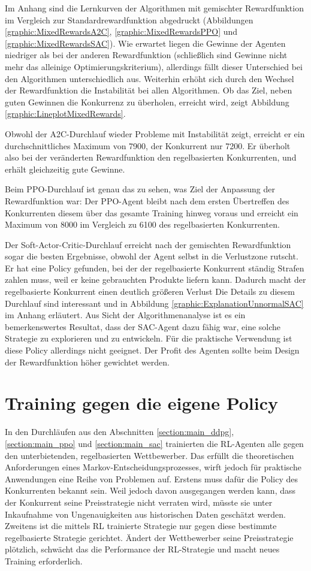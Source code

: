 Im Anhang sind die Lernkurven der Algorithmen mit gemischter Rewardfunktion im Vergleich zur Standardrewardfunktion abgedruckt (Abbildungen \ref{graphic:MixedRewardsA2C}, \ref{graphic:MixedRewardsPPO} und \ref{graphic:MixedRewardsSAC}).
Wie erwartet liegen die Gewinne der Agenten niedriger als bei der anderen Rewardfunktion (schließlich sind Gewinne nicht mehr das alleinige Optimierungskriterium), allerdings fällt dieser Unterschied bei den Algorithmen unterschiedlich aus.
Weiterhin erhöht sich durch den Wechsel der Rewardfunktion die Instabilität bei allen Algorithmen.
Ob das Ziel, neben guten Gewinnen die Konkurrenz zu überholen, erreicht wird, zeigt Abbildung \ref{graphic:LineplotMixedRewards}.

Obwohl der A2C-Durchlauf wieder Probleme mit Instabilität zeigt, erreicht er ein durchschnittliches Maximum von 7900, der Konkurrent nur 7200.
Er überholt also bei der veränderten Rewardfunktion den regelbasierten Konkurrenten, und erhält gleichzeitig gute Gewinne.

Beim PPO-Durchlauf ist genau das zu sehen, was Ziel der Anpassung der Rewardfunktion war:
Der PPO-Agent bleibt nach dem ersten Übertreffen des Konkurrenten diesem über das gesamte Training hinweg voraus und erreicht ein Maximum von 8000 im Vergleich zu 6100 des regelbasierten Konkurrenten.

Der Soft-Actor-Critic-Durchlauf erreicht nach der gemischten Rewardfunktion sogar die besten Ergebnisse, obwohl der Agent selbst in die Verlustzone rutscht.
Er hat eine Policy gefunden, bei der der regelbasierte Konkurrent ständig Strafen zahlen muss, weil er keine gebrauchten Produkte liefern kann.
Dadurch macht der regelbasierte Konkurrent einen deutlich größeren Verlust
Die Details zu diesem Durchlauf sind interessant und in Abbildung \ref{graphic:ExplanationUnnormalSAC} im Anhang erläutert.
Aus Sicht der Algorithmenanalyse ist es ein bemerkenswertes Resultat, dass der SAC-Agent dazu fähig war, eine solche Strategie zu explorieren und zu entwickeln.
Für die praktische Verwendung ist diese Policy allerdings nicht geeignet.
Der Profit des Agenten sollte beim Design der Rewardfunktion höher gewichtet werden.

\section{Training gegen die eigene Policy}
\label{section:self_play}
In den Durchläufen aus den Abschnitten \ref{section:main_ddpg}, \ref{section:main_ppo} und \ref{section:main_sac} trainierten die RL-Agenten alle gegen den unterbietenden, regelbasierten Wettbewerber.
Das erfüllt die theoretischen Anforderungen eines Markov-Entscheidungsprozesses, wirft jedoch für praktische Anwendungen eine Reihe von Problemen auf.
Erstens muss dafür die Policy des Konkurrenten bekannt sein.
Weil jedoch davon ausgegangen werden kann, dass der Konkurrent seine Preisstrategie nicht verraten wird, müsste sie unter Inkaufnahme von Ungenauigkeiten aus historischen Daten geschätzt werden.
Zweitens ist die mittels RL trainierte Strategie nur gegen diese bestimmte regelbasierte Strategie gerichtet.
Ändert der Wettbewerber seine Preisstrategie plötzlich, schwächt das die Performance der RL-Strategie und macht neues Training erforderlich.

